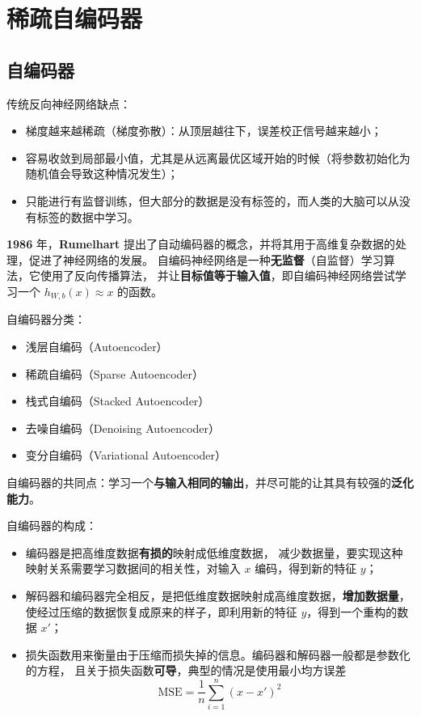 \section{稀疏自编码器}
\subsection{自编码器}
传统反向神经网络缺点：
\begin{itemize}
    \item 梯度越来越稀疏（梯度弥散）：从顶层越往下，误差校正信号越来越小；
    \item 容易收敛到局部最小值，尤其是从远离最优区域开始的时候（将参数初始化为随机值会导致这种情况发生）；
    \item 只能进行有监督训练，但大部分的数据是没有标签的，而人类的大脑可以从没有标签的数据中学习。
\end{itemize}

\textbf{1986} 年，\textbf{Rumelhart} 提出了自动编码器的概念，并将其用于高维复杂数据的处理，促进了神经网络的发展。
自编码神经网络是一种\textbf{无监督}（自监督）学习算法，它使用了反向传播算法，
并让\textbf{目标值等于输入值}，即自编码神经网络尝试学习一个 $h_{W, b}(x) \approx x$ 的函数。

自编码器分类：
\begin{itemize}
    \item 浅层自编码（Autoencoder）
    \item 稀疏自编码（Sparse Autoencoder）
    \item 栈式自编码（Stacked Autoencoder）
    \item 去噪自编码（Denoising Autoencoder）
    \item 变分自编码（Variational Autoencoder）
\end{itemize}

自编码器的共同点：学习一个\textbf{与输入相同的输出}，并尽可能的让其具有较强的\textbf{泛化能力}。

自编码器的构成：
\begin{itemize}
    \item 编码器是把高维度数据\textbf{有损的}映射成低维度数据，
    减少数据量，要实现这种映射关系需要学习数据间的相关性，对输入 $x$ 编码，得到新的特征 $y$；
    \item 解码器和编码器完全相反，是把低维度数据映射成高维度数据，\textbf{增加数据量}，
    使经过压缩的数据恢复成原来的样子，即利用新的特征 $y$，得到一个重构的数据 $x'$；
    \item 损失函数用来衡量由于压缩而损失掉的信息。编码器和解码器一般都是参数化的方程，
    且关于损失函数\textbf{可导}，典型的情况是使用最小均方误差
    \begin{equation}
        \text{MSE} = \dfrac 1n \sum\limits_{i=1}^n (x - x')^2
    \end{equation}
\end{itemize}

